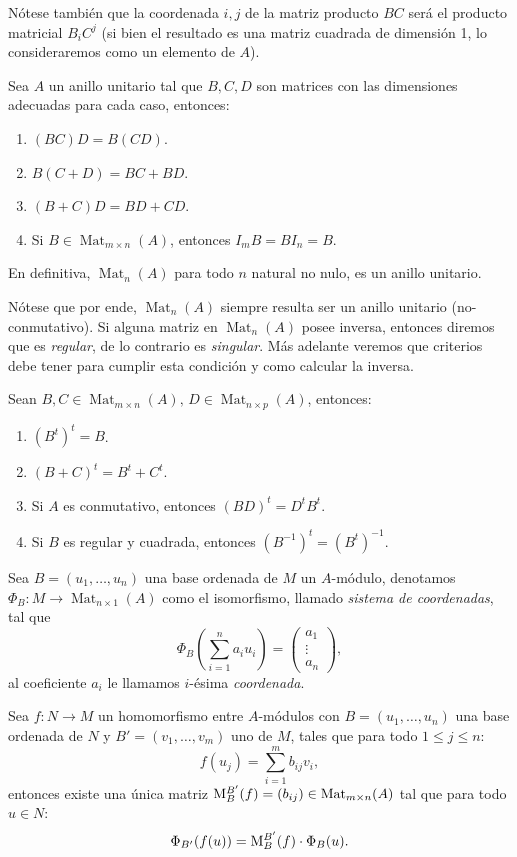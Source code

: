 \documentclass[11pt,oneside]{book}
\DeclareMathOperator{\Mat}{Mat}
\begin{document}
Nótese también que la coordenada $i,j$ de la matriz producto $BC$ será el producto matricial $B_iC^j$ (si bien el resultado es una matriz cuadrada de dimensión 1, lo consideraremos como un elemento de $A$).
\begin{thm}
Sea $A$ un anillo unitario tal que $B,C,D$ son matrices con las dimensiones adecuadas para cada caso, entonces:
\begin{enumerate}
	\item $(BC)D=B(CD)$.
	\item $B(C+D)=BC+BD$.
	\item $(B+C)D=BD+CD$.
	\item Si $B\in\Mat_{m\times n}(A)$, entonces $I_mB=BI_n=B$.
\end{enumerate}
En definitiva, $\Mat_n(A)$ para todo $n$ natural no nulo, es un anillo unitario.
\end{thm}
Nótese que por ende, $\Mat_n(A)$ siempre resulta ser un anillo unitario (no-conmutativo). Si alguna matriz en $\Mat_n(A)$ posee inversa, entonces diremos que es \textit{regular}, de lo contrario es \textit{singular}. Más adelante veremos que criterios debe tener para cumplir esta condición y como calcular la inversa.
\begin{thm}
Sean $B,C\in\Mat_{m\times n}(A),\,D\in\Mat_{n\times p}(A)$, entonces:
\begin{enumerate}
	\item $(B^t)^t=B$.
	\item $(B+C)^t=B^t+C^t$.
	\item Si $A$ es conmutativo, entonces $(BD)^t=D^tB^t$.
	\item Si $B$ es regular y cuadrada, entonces $(B^{-1})^t=(B^t)^{-1}$.
\end{enumerate}
\end{thm}
Sea $B=(u_1,\dots,u_n)$ una base ordenada de $M$ un $A$-módulo, denotamos $\Phi_B:M\rightarrow\Mat_{n\times 1}(A)$ como el isomorfismo, llamado \textit{sistema de coordenadas}, tal que
$$\Phi_B\left(\sum_{i=1}^n a_iu_i\right)=\begin{pmatrix}
a_1\\ \vdots\\ a_n
\end{pmatrix},$$
al coeficiente $a_i$ le llamamos $i$-ésima \textit{coordenada}.
\begin{thm}\label{thm:matrix-morphism}
Sea $f:N\rightarrow M$ un homomorfismo entre $A$-módulos con $B=(u_1,\dots,u_n)$ una base ordenada de $N$ y $B'=(v_1,\dots,v_m)$ uno de $M$, tales que para todo $1\leq j\leq n$:
$$f(u_j)=\sum_{i=1}^m b_{ij}v_i,$$
entonces existe una única matriz ${\rm M}_B^{B'}(f)=(b_{ij})\in\Mat_{m\times n}(A)$  tal que para todo $u\in N$:
$$\Phi_{B'}(f(u))={\rm M}_B^{B'}(f)\cdot\Phi_B(u).$$
\end{thm}
\end{document}
